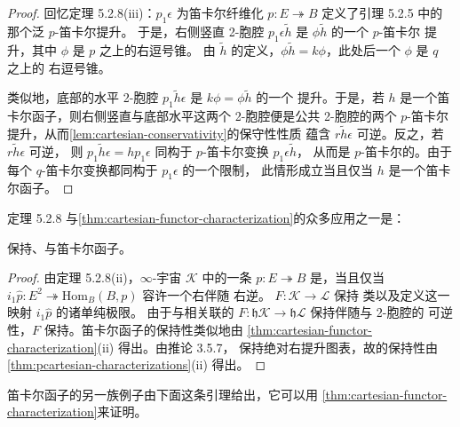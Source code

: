 \begin{proof}
回忆定理 5.2.8(iii)：$p_{1}\epsilon$ 为笛卡尔纤维化 $p\colon E\twoheadrightarrow B$ %
定义了引理 5.2.5 中的那个泛 $p$-笛卡尔提升。
于是，右侧竖直 2-胞腔 $p_{1}\epsilon\tilde{h}$ 是 $\phi\tilde{h}$ 的一个 $p$-笛卡尔%
提升，其中 $\phi$ 是 $p$ 之上的右逗号锥。
由 $\tilde{h}$ 的定义，$\phi\tilde{h}=k\phi$，此处后一个 $\phi$ 是 $q$ 之上的%
右逗号锥。

类似地，底部的水平 2-胞腔 $p_{1}\tilde{h}\epsilon$ 是 $k\phi=\phi\tilde{h}$ 的一个%
提升。于是，若 $h$ 是一个笛卡尔函子，则右侧竖直与底部水平这两个 2-胞腔便是公共%
2-胞腔的两个 $p$-笛卡尔提升，从而\cref{lem:cartesian-conservativity}的保守性性质%
蕴含 $r\tilde{h}\epsilon$ 可逆。反之，若 $r\tilde{h}\epsilon$ 可逆，%
则 $p_{1}\tilde{h}\epsilon=hp_{1}\epsilon$ 同构于 $p$-笛卡尔变换 $p_{1}\epsilon\tilde{h}$，%
从而是 $p$-笛卡尔的。由于每个 $q$-笛卡尔变换都同构于 $p_{1}\epsilon$ 的一个限制，%
此情形成立当且仅当 $h$ 是一个笛卡尔函子。
\end{proof}

定理 5.2.8 与\cref{thm:cartesian-functor-characterization}的众多应用之一是：

\begin{corollary}\label{cor:cosmological-functors-preserve-cartesian}
\trCosmologicalFunctor{}保持\trCartesianArrow、\trCartesianFibration{}与笛卡尔函子。
\end{corollary}

\begin{proof}
由定理 5.2.8(ii)，$\infty$-宇宙 $\mathcal{K}$ 中的一条\trIsofibration{} %
$p\colon E\twoheadrightarrow B$ 是\trCartesian，当且仅当\trIsofibration{} %
$i_{1}\hat{p}\colon E^{2}\twoheadrightarrow\mathrm{Hom}_{B}(B,p)$ 容许一个右伴随%
右逆。\trCosmologicalFunctor{} $F\colon\mathcal{K}\to\mathcal{L}$ 保持%
\trIsofibration{}类以及定义这一映射 $i_{1}\hat{p}$ 的诸单纯极限。
由于与\trCosmologicalFunctor{}相关联的\trTwoFunctor{} %
$F\colon\mathfrak{h}\mathcal{K}\to\mathfrak{h}\mathcal{L}$ 保持伴随与 2-胞腔的%
可逆性，$F$ 保持\trCartesianFibration。笛卡尔函子的保持性类似地由%
\cref{thm:cartesian-functor-characterization}(ii) 得出。由推论 3.5.7，%
\trCosmologicalFunctor{}保持绝对右提升图表，故\trCartesianArrow{}的保持性由%
\cref{thm:pcartesian-characterizations}(ii) 得出。
\end{proof}

笛卡尔函子的另一族例子由下面这条引理给出，它可以用%
\cref{thm:cartesian-functor-characterization}来证明。

